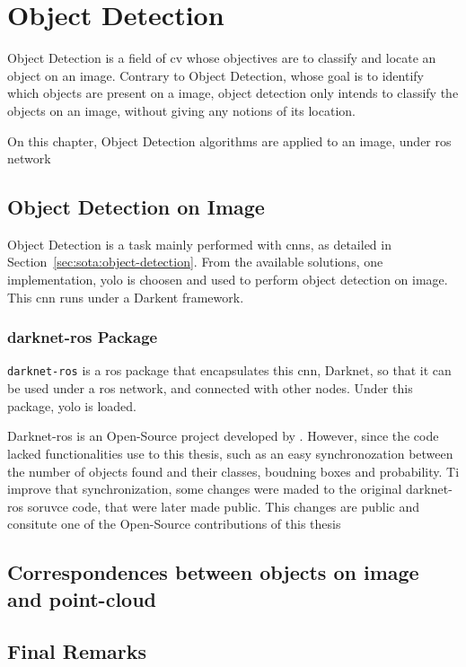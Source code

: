 \chapter{Object Detection}
\label{chapter:object_detection}


Object Detection is a field of \ac{cv} whose objectives are to classify and locate an object on an image. Contrary to Object Detection, whose goal is to identify which objects are present on a image, object detection only intends to classify the objects on an image, without giving any notions of its location. 


On this chapter, Object Detection algorithms are applied to an image, under \ac{ros} network

\section{Object Detection on Image}
Object Detection is a task mainly performed with \acfp{cnn}, as detailed in Section~\ref{sec:sota:object-detection}. From the available solutions, one implementation, \ac{yolo} is choosen and used to perform object detection on image. This \ac{cnn} runs under a Darkent framework.

\subsection{darknet-ros Package}
\verb`darknet-ros` is a \ac{ros} package that encapsulates this \ac{cnn}, Darknet, so that it can be used under a \ac{ros} network, and connected with other nodes. Under this package, \ac{yolo} is loaded.

Darknet-ros is an Open-Source project developed by . However, since the code lacked  functionalities use to this thesis, such as an easy synchronozation between the number of objects found and their classes, boudning boxes and probability. Ti improve that synchronization, some changes were maded to the original darknet-ros soruvce code, that were later made public. This changes are public and consitute one of the Open-Source contributions of this thesis


\section{Correspondences between objects on image and point-cloud}

\section{Final Remarks}
